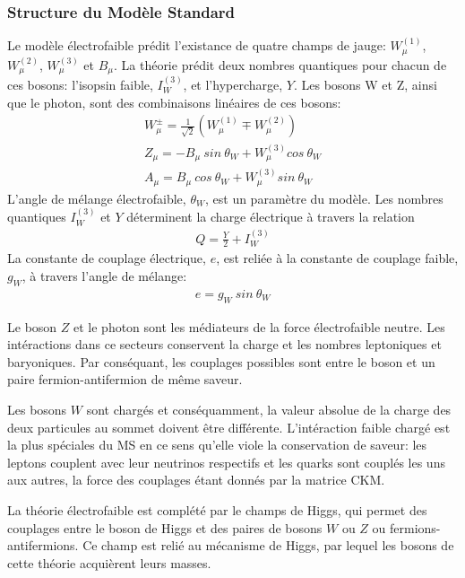 \subsubsection{Structure du Modèle Standard}
\label{sec:ms:th:struct}


Le modèle électrofaible prédit l'existance de quatre champs de jauge:
$W^{(1)}_\mu$, $W^{(2)}_\mu$, $W^{(3)}_\mu$ et $B_\mu$. La théorie
prédit deux nombres quantiques pour chacun de ces bosons: l'isopsin
faible, $I^{(3)}_W$, et l'hypercharge, $Y$. Les bosons W et Z, ainsi
que le photon, sont des combinaisons linéaires de ces bosons:
\begin{eqnarray}
  \label{eq:ewk_mix}
  W^{\pm}_\mu = \frac{1}{\sqrt{2}}(W^{(1)}_\mu \mp W^{(2)}_\mu)  \\
  Z_\mu = -B_\mu\ sin\ \theta_W + W^{(3)}_\mu cos\ \theta_W \\
  A_\mu = B_\mu\ cos\ \theta_W + W^{(3)}_\mu sin\ \theta_W
\end{eqnarray}
L'angle de mélange électrofaible, $\theta_W$, est un paramètre du
modèle. Les nombres quantiques $I^{(3)}_W$ et $Y$ déterminent la
charge électrique à travers la relation
\begin{eqnarray}
  Q = \frac{Y}{2} + I^{(3)}_W
\end{eqnarray}
La constante de couplage électrique, $e$, est reliée à la constante de
couplage faible, $g_W$, à travers l'angle de mélange:
\begin{eqnarray}
  e = g_W\ sin\ \theta_W
\end{eqnarray}

Le boson $Z$ et le photon sont les médiateurs de la force
électrofaible neutre. Les intéractions dans ce secteurs conservent la
charge et les nombres leptoniques et baryoniques. Par conséquant, les
couplages possibles sont entre le boson et un paire
fermion-antifermion de même saveur.

Les bosons $W$ sont chargés et conséquamment, la valeur absolue de la
charge des deux particules au sommet doivent être
différente. L'intéraction faible chargé est la plus spéciales du MS en
ce sens qu'elle viole la conservation de saveur: les leptons couplent
avec leur neutrinos respectifs et les quarks sont couplés les uns aux
autres, la force des couplages étant donnés par la matrice CKM.

La théorie électrofaible est complété par le champs de Higgs, qui
permet des couplages entre le boson de Higgs et des paires de bosons $W$ ou $Z$
ou fermions-antifermions. Ce champ est relié au mécanisme de Higgs,
par lequel les bosons de cette théorie acquièrent leurs masses. \\

